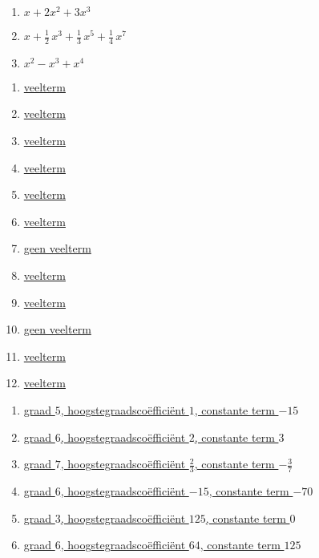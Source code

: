 \documentclass{ximera}
\begin{document}
    \begin{Antwoord} \label{antw1.2}
    \begin{enumerate}
    \item
    \hyperlink{oef1.2}{$x + 2x^2 + 3x^3$}
    \item
    \hyperlink{oef1.2}{$x + \frac{1}{2}\,x^3 + \frac{1}{3}\,x^5 + \frac{1}{4}\,x^7$}
    \item
    \hyperlink{oef1.2}{$x^2 - x^3 + x^4$}
    \end{enumerate}
    \end{Antwoord}
    
    \begin{Antwoord} \label{antw1.3}
    \begin{enumerate}
    \item
    \hyperlink{oef1.3}{veelterm}
    \item
    \hyperlink{oef1.3}{veelterm}
    \item
    \hyperlink{oef1.3}{veelterm}
    \item
    \hyperlink{oef1.3}{veelterm}
    \item
    \hyperlink{oef1.3}{veelterm}
    \item
    \hyperlink{oef1.3}{veelterm}
    \item
    \hyperlink{oef1.3}{geen veelterm}
    \item
    \hyperlink{oef1.3}{veelterm}
    \item
    \hyperlink{oef1.3}{veelterm}
    \item
    \hyperlink{oef1.3}{geen veelterm}
    \item
    \hyperlink{oef1.3}{veelterm}
    \item
    \hyperlink{oef1.3}{veelterm}
    \end{enumerate}
    \setcounter{enumi}{4}
    \end{Antwoord}
    
    \clearpage
    
    \begin{Antwoord} \label{antw1.5}
    \begin{enumerate}
    \item
    \hyperlink{oef1.5}{graad $5$, hoogstegraadsco\"effici\"ent $1$, constante term $-15$}
    \item
    \hyperlink{oef1.5}{graad $6$, hoogstegraadsco\"effici\"ent $2$, constante term $3$}
    \item
    \hyperlink{oef1.5}{graad $7$, hoogstegraadsco\"effici\"ent $\frac{2}{3}$, constante term $-\frac{3}{7}$}
    \item
    \hyperlink{oef1.5}{graad $6$, hoogstegraadsco\"effici\"ent $-15$, constante term $-70$}
    \item
    \hyperlink{oef1.5}{graad $3$, hoogstegraadsco\"effici\"ent $125$, constante term $0$}
    \item
    \hyperlink{oef1.5}{graad $6$, hoogstegraadsco\"effici\"ent $64$, constante term $125$}
    \end{enumerate}
    \setcounter{enumi}{6}
    \end{Antwoord}
    
\end{document}
